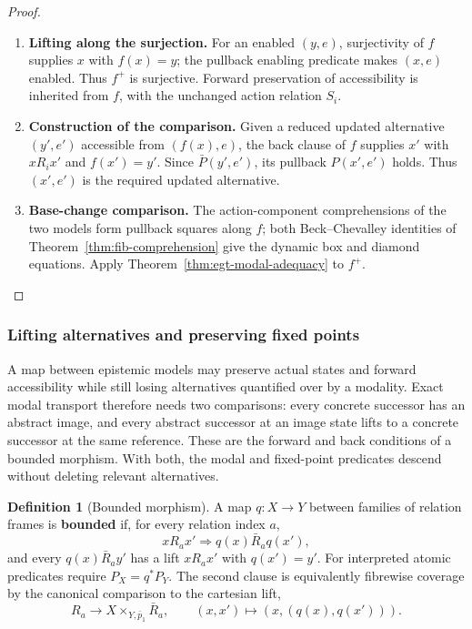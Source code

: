 \documentclass[11pt,a4paper]{article}
\numberwithin{equation}{section}
\theoremstyle{definition}
\newtheorem{definition}[theorem]{Definition}
\theoremstyle{remark}
\theoremstyle{plain}
\begin{document}
\begin{proof}
\leavevmode
\begin{enumerate}[label=\textup{(\arabic*)},leftmargin=*,itemsep=4pt,topsep=3pt]
  \item \textbf{Lifting along the surjection.} For an enabled $(y,e)$, surjectivity of $f$ supplies $x$ with $f(x)=y$;
the pullback enabling predicate makes $(x,e)$ enabled. Thus $f^+$ is
surjective. Forward preservation of accessibility is inherited from
$f$, with the unchanged action relation $S_i$.
  \item \textbf{Construction of the comparison.} Given a reduced
updated alternative $(y',e')$ accessible from $(f(x),e)$, the back
clause of $f$ supplies $x'$ with $xR_ix'$ and $f(x')=y'$. Since
$\bar P(y',e')$, its pullback $P(x',e')$ holds. Thus $(x',e')$ is the
required updated alternative.
  \item \textbf{Base-change comparison.} The action-component comprehensions
of the two models form pullback squares along $f$; both
Beck--Chevalley identities of Theorem~\ref{thm:fib-comprehension}
give the dynamic box and diamond equations. Apply
Theorem~\ref{thm:egt-modal-adequacy} to $f^+$.
\end{enumerate}
\end{proof}

\subsubsection{Lifting alternatives and preserving fixed points}
\label{sec:egt-modal-transport}

A map between epistemic models may preserve actual states and
forward accessibility while still losing alternatives quantified over
by a modality. Exact modal transport therefore needs two comparisons:
every concrete successor has an abstract image, and every abstract
successor at an image state lifts to a concrete successor at the same
reference. These are the forward and back conditions of a bounded
morphism. With both, the modal and fixed-point predicates descend
without deleting relevant alternatives.

\begin{definition}[Bounded morphism]
\label{def:egt-bounded-morphism}
A map $q:X\to Y$ between families of relation frames is \textbf{bounded} if,
for every relation index $a$,
\[
 xR_ax'\Longrightarrow q(x)\bar R_aq(x'),
\]
and every $q(x)\bar R_ay'$ has a lift $xR_ax'$ with $q(x')=y'$.
For interpreted atomic predicates require $P_X=q^*P_Y$.
The second clause is equivalently fibrewise coverage by the canonical comparison to the cartesian lift,
\[
 R_a\longrightarrow X\times_{Y,\bar p_1}\bar R_a,
 \qquad(x,x')\longmapsto(x,(q(x),q(x'))).
\]
\end{definition}
\end{document}
